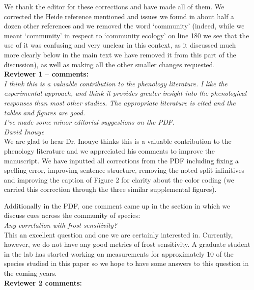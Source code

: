 \documentclass[11pt,a4paper]{article}
\begin{document}
We thank the editor for these corrections and have made all of them. We corrected the Heide reference mentioned and issues we found in about half a dozen other references and we removed the word `community' (indeed, while we meant `community' in respect to `community ecology' on line 180 we see that the use of it was confusing and very unclear in this context, as it discussed much more clearly below in the main text we have removed it from this part of the discussion), as well as making all the other smaller changes requested. \\

{\bf Reviewer 1 -- comments:} \\

\emph{I think this is a valuable contribution to the phenology literature. I like the experimental approach, and think it provides greater insight into the phenological responses than most other studies.  The appropriate literature is cited and the tables and figures are good.\\
I've made some minor editorial suggestions on the PDF.\\
David Inouye}\\

We are glad to hear Dr. Inouye thinks this is a valuable contribution to the phenology literature and we appreciated his comments to improve the manuscript. We have inputted all corrections from the PDF including fixing a spelling error, improving sentence structure, removing the noted split infinitives and improving the caption of Figure 2 for clarity about the color coding (we carried this correction through the three similar supplemental figures). 

Additionally in the PDF, one comment came up in the section in which we discuss cues across the community of species:\\

\emph{Any correlation with frost sensitivity?}\\

This an excellent question and one we are certainly interested in. Currently, however, we do not have any good metrics of frost sensitivity. A graduate student in the lab has started working on measurements for approximately 10 of the species studied in this paper so we hope to have some answers to this question in the coming years.\\

{\bf Reviewer 2 comments:} \\
\end{document}
